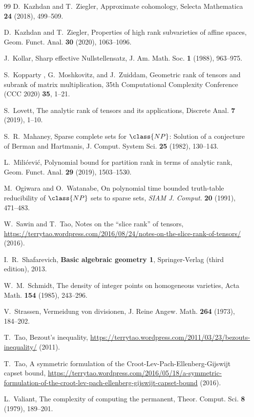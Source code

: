 \begin{thebibliography}{99}
D.~Kazhdan and T.~Ziegler, 
{Approximate cohomology}, 
{Selecta Mathematica} \textbf{24} (2018), 499--509.

D.~Kazhdan and T.~Ziegler,
{Properties of high rank subvarieties of affine spaces}, 
{Geom. Funct. Anal.} \textbf{30} (2020), 1063--1096.

J.~Kollar,
{Sharp effective Nullstellensatz}, 
{J. Am. Math. Soc.} \textbf{1} (1988), 963--975.

S.~Kopparty , G.~Moshkovitz, and J.~Zuiddam,
{Geometric rank of tensors and subrank of matrix multiplication},
{35th Computational Complexity Conference (CCC 2020)} \textbf{35}, 1--21.

S.~Lovett,
{The analytic rank of tensors and its applications},
{Discrete Anal.} \textbf{7} (2019), 1--10.

S.~R.~Mahaney, 
{Sparse complete sets for $\class{NP}$: Solution of a conjecture of Berman and Hartmanis},
{J. Comput. System Sci.} \textbf{25} (1982), 130--143.

L.~Mili\'{c}evi\'{c},
{Polynomial bound for partition rank in terms of analytic rank}, 
{Geom. Funct. Anal.} \textbf{29} (2019), 1503--1530.

M.~Ogiwara and O.~Watanabe,
{On polynomial time bounded truth-table reducibility of $\class{NP}$ sets to sparse sets}, 
\emph{SIAM J. Comput.} \textbf{20} (1991), 471--483.

W.~Sawin and T.~Tao,
{Notes on the ``slice rank'' of tensors},
\href{https://terrytao.wordpress.com/2016/08/24/notes-on-the-slice-rank-of-tensors/}{https://terrytao.wordpress.com/2016/08/24/notes-on-the-slice-rank-of-tensors/} (2016).

I.~R.~Shafarevich, 
{\bf Basic algebraic geometry 1}, 
Springer-Verlag (third edition), 2013.

W.~M.~Schmidt,
{The density of integer points on homogeneous varieties}, 
{Acta Math.} \textbf{154} (1985), 243--296.

V.~Strassen,
{Vermeidung von divisionen},
{J. Reine Angew. Math.} \textbf{264} (1973), 184--202.

T.~Tao,
{Bezout's inequality},
\href{https://terrytao.wordpress.com/2011/03/23/bezouts-inequality/}{https://terrytao.wordpress.com/2011/03/23/bezouts-inequality/} (2011).

T.~Tao,
{A symmetric formulation of the {C}root-{L}ev-{P}ach-{E}llenberg-{G}ijswijt capset bound},
\href{https://terrytao.wordpress.com/2016/05/18/a-symmetric-formulation-of-the-croot-lev-pach-ellenberg-gijswijt-capset-bound}{https://terrytao.wordpress.com/2016/05/18/a-symmetric-formulation-of-the-croot-lev-pach-ellenberg-gijswijt-capset-bound} (2016).

L.~Valiant,
{The complexity of computing the permanent},
{Theor. Comput. Sci.} \textbf{8} (1979), 189--201.

\end{thebibliography}
